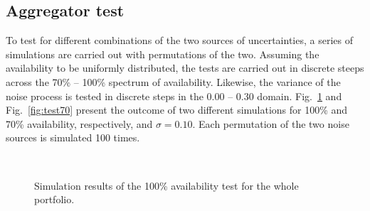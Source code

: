 \subsection{Aggregator test}
To test for different combinations of the two sources of uncertainties, a series of simulations are carried out with permutations of the two. Assuming the availability to be uniformly distributed, the tests are carried out in discrete steeps across the 70\% -- 100\% spectrum of availability. Likewise, the variance of the noise process is tested in discrete steps in the 0.00 -- 0.30 domain. Fig.~\ref{fig:test100} and Fig.~\ref{fig:test70} present the outcome of two different simulations for 100\% and 70\% availability, respectively, and $\sigma=0.10$. Each permutation of the two noise sources is simulated 100 times.
\begin{figure}[!t]
\centering
{}
\\
\caption{Simulation results of the 100\% availability test for the whole portfolio.}
\label{fig:test100}
\end{figure}


